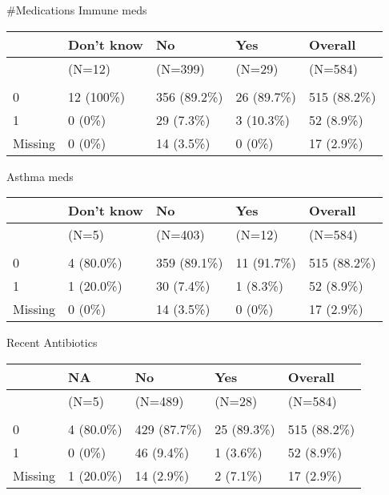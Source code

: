 \documentclass[
]{article}
\begin{document}
\#Medications Immune meds

\begin{tabular}[t]{lllll}
\toprule
  & Don't know & No & Yes & Overall\\
\midrule
 & (N=12) & (N=399) & (N=29) & (N=584)\\
\addlinespace[0.3em]
\multicolumn{5}{l}{\textbf{piab\_pos}}\\
\hspace{1em}0 & 12 (100\%) & 356 (89.2\%) & 26 (89.7\%) & 515 (88.2\%)\\
\hspace{1em}1 & 0 (0\%) & 29 (7.3\%) & 3 (10.3\%) & 52 (8.9\%)\\
\hspace{1em}Missing & 0 (0\%) & 14 (3.5\%) & 0 (0\%) & 17 (2.9\%)\\
\bottomrule
\end{tabular}

Asthma meds

\begin{tabular}[t]{lllll}
\toprule
  & Don't know & No & Yes & Overall\\
\midrule
 & (N=5) & (N=403) & (N=12) & (N=584)\\
\addlinespace[0.3em]
\multicolumn{5}{l}{\textbf{piab\_pos}}\\
\hspace{1em}0 & 4 (80.0\%) & 359 (89.1\%) & 11 (91.7\%) & 515 (88.2\%)\\
\hspace{1em}1 & 1 (20.0\%) & 30 (7.4\%) & 1 (8.3\%) & 52 (8.9\%)\\
\hspace{1em}Missing & 0 (0\%) & 14 (3.5\%) & 0 (0\%) & 17 (2.9\%)\\
\bottomrule
\end{tabular}

Recent Antibiotics

\begin{tabular}[t]{lllll}
\toprule
  & NA & No & Yes & Overall\\
\midrule
 & (N=5) & (N=489) & (N=28) & (N=584)\\
\addlinespace[0.3em]
\multicolumn{5}{l}{\textbf{piab\_pos}}\\
\hspace{1em}0 & 4 (80.0\%) & 429 (87.7\%) & 25 (89.3\%) & 515 (88.2\%)\\
\hspace{1em}1 & 0 (0\%) & 46 (9.4\%) & 1 (3.6\%) & 52 (8.9\%)\\
\hspace{1em}Missing & 1 (20.0\%) & 14 (2.9\%) & 2 (7.1\%) & 17 (2.9\%)\\
\bottomrule
\end{tabular}
\end{document}
